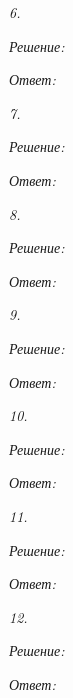 \emph{6. }

\vspace*{2em}
\emph{Решение:}

\vspace*{2em}
\emph{Ответ: }

\newpage %

\emph{7. }

\vspace*{2em}
\emph{Решение:}

\vspace*{2em}
\emph{Ответ: }

\newpage %

\emph{8. }

\vspace*{2em}
\emph{Решение:}

\vspace*{2em}
\emph{Ответ: }

\newpage %

\emph{9. }

\vspace*{2em}
\emph{Решение:}

\vspace*{2em}
\emph{Ответ: }

\newpage %

\emph{10. }

\vspace*{2em}
\emph{Решение:}

\vspace*{2em}
\emph{Ответ: }

\newpage %

\emph{11. }

\vspace*{2em}
\emph{Решение:}

\vspace*{2em}
\emph{Ответ: }

\newpage %

\emph{12. }

\vspace*{2em}
\emph{Решение:}

\vspace*{2em}
\emph{Ответ: }

